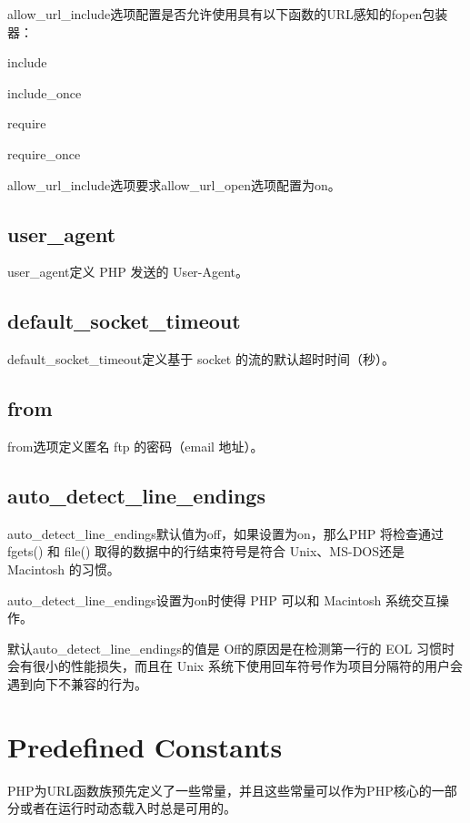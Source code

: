 allow\_url\_include选项配置是否允许使用具有以下函数的URL感知的fopen包装器：

\begin{compactitem}
\item include
\item include\_once
\item require
\item require\_once
\end{compactitem}

allow\_url\_include选项要求allow\_url\_open选项配置为on。

\subsection{user\_agent}


user\_agent定义 PHP 发送的 User-Agent。

\subsection{default\_socket\_timeout}

default\_socket\_timeout定义基于 socket 的流的默认超时时间（秒）。

\subsection{from}

from选项定义匿名 ftp 的密码（email 地址）。

\subsection{auto\_detect\_line\_endings}

auto\_detect\_line\_endings默认值为off，如果设置为on，那么PHP 将检查通过 fgets() 和 file() 取得的数据中的行结束符号是符合 Unix、MS-DOS还是 Macintosh 的习惯。


auto\_detect\_line\_endings设置为on时使得 PHP 可以和 Macintosh 系统交互操作。

默认auto\_detect\_line\_endings的值是 Off的原因是在检测第一行的 EOL 习惯时会有很小的性能损失，而且在 Unix 系统下使用回车符号作为项目分隔符的用户会遇到向下不兼容的行为。


\section{Predefined Constants}

PHP为URL函数族预先定义了一些常量，并且这些常量可以作为PHP核心的一部分或者在运行时动态载入时总是可用的。


